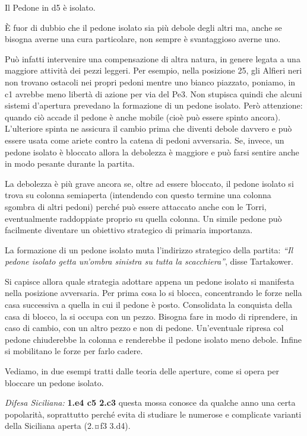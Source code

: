 \documentclass[
]{article}
\begin{document}
Il Pedone in d5 è isolato.

È fuor di dubbio che il pedone isolato sia più debole degli altri ma,
anche se bisogna averne una cura particolare, non sempre è svantaggioso
averne uno.

Può infatti intervenire una compensazione di altra natura, in genere
legata a una maggiore attività dei pezzi leggeri. Per esempio, nella
posizione 25, gli Alfieri neri non trovano ostacoli nei propri pedoni
mentre uno bianco piazzato, poniamo, in c1 avrebbe meno libertà di
azione per via del Pe3. Non stupisca quindi che alcuni sistemi
d'apertura prevedano la formazione di un pedone isolato. Però
attenzione: quando ciò accade il pedone è anche mobile (cioè può essere
spinto ancora). L'ulteriore spinta ne assicura il cambio prima che
diventi debole davvero e può essere usata come ariete contro la catena
di pedoni avversaria. Se, invece, un pedone isolato è bloccato allora la
debolezza è maggiore e può farsi sentire anche in modo pesante durante
la partita.

La debolezza è più grave ancora se, oltre ad essere bloccato, il pedone
isolato si trova su colonna semiaperta (intendendo con questo termine
una colonna sgombra di altri pedoni) perché può essere attaccato anche
con le Torri, eventualmente raddoppiate proprio su quella colonna. Un
simile pedone può facilmente diventare un obiettivo strategico di
primaria importanza.

La formazione di un pedone isolato muta l'indirizzo strategico della
partita: \emph{``Il pedone isolato getta un'ombra sinistra su tutta la
scacchiera''}, disse Tartakower.

Si capisce allora quale strategia adottare appena un pedone isolato si
manifesta nella posizione avversaria. Per prima cosa lo si blocca,
concentrando le forze nella casa successiva a quella in cui il pedone è
posto. Consolidata la conquista della casa di blocco, la si occupa con
un pezzo. Bisogna fare in modo di riprendere, in caso di cambio, con un
altro pezzo e non di pedone. Un'eventuale ripresa col pedone chiuderebbe
la colonna e renderebbe il pedone isolato meno debole. Infine si
mobilitano le forze per farlo cadere.

Vediamo, in due esempi tratti dalle teoria delle aperture, come si opera
per bloccare un pedone isolato.

\emph{Difesa Siciliana:} \textbf{1.e4 c5 2.c3} questa mossa conosce da
qualche anno una certa popolarità, soprattutto perché evita di studiare
le numerose e complicate varianti della Siciliana aperta (2.¤f3 3.d4).
\end{document}
